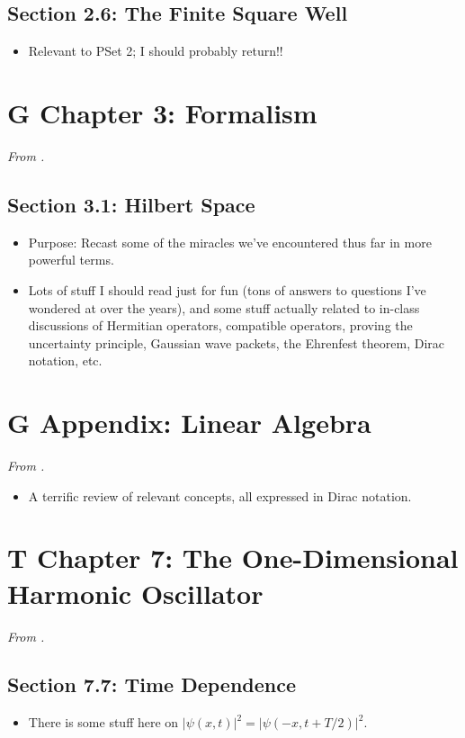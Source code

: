 \documentclass[../notes.tex]{subfiles}
\begin{document}
\subsection*{Section 2.6: The Finite Square Well}
\begin{itemize}
    \item Relevant to PSet 2; I should probably return!!
\end{itemize}



\section{G Chapter 3: Formalism}
\emph{From \textcite{bib:Griffiths}.}
\subsection*{Section 3.1: Hilbert Space}
\begin{itemize}
    \item Purpose: Recast some of the miracles we've encountered thus far in more powerful terms.
    \item Lots of stuff I should read just for fun (tons of answers to questions I've wondered at over the years), and some stuff actually related to in-class discussions of Hermitian operators, compatible operators, proving the uncertainty principle, Gaussian wave packets, the Ehrenfest theorem, Dirac notation, etc.
\end{itemize}



\section{G Appendix: Linear Algebra}
\emph{From \textcite{bib:Griffiths}.}
\begin{itemize}
    \item A terrific review of relevant concepts, all expressed in Dirac notation.
\end{itemize}



\section{T Chapter 7: The One-Dimensional Harmonic Oscillator}
\emph{From \textcite{bib:Townsend}.}
\subsection*{Section 7.7: Time Dependence}
\begin{itemize}
    \item There is some stuff here on $|\psi(x,t)|^2=|\psi(-x,t+T/2)|^2$.
\end{itemize}
\end{document}
